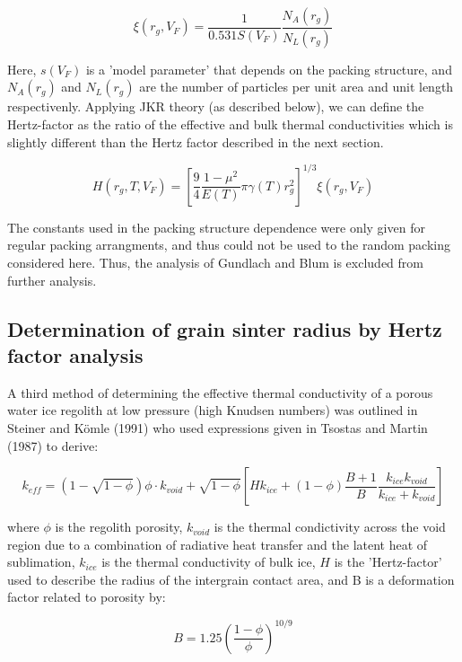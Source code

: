 \documentclass[11pt]{article} %
\newcommand{\vf}{\ensuremath{V_{F}}\xspace}
\begin{document}
\begin{itemize}
	\begin{equation}
	\xi(r_{g}, \vf) = \frac{1}{0.531 S(\vf)} \frac{N_{A}(r_{g})}{N_{L}(r_{g})}
	\end{equation}

	Here, $s(\vf)$ is a 'model parameter' that depends on the packing structure, and $N_{A}(r_{g})$ and $N_{L}(r_{g})$ are the number of particles per unit area and unit length respectivenly. Applying JKR theory (as described below), we can define the Hertz-factor as the ratio of the effective and bulk thermal conductivities which is slightly different than the Hertz factor described in the next section. 
	 
	\begin{equation} \label{eq:GBHertz}
	H(r_{g}, T, \vf) = [\frac{9}{4} \frac{1-\mu^{2}}{E(T)} \pi \gamma(T) r_{g}^{2} ]^{1/3} \xi(r_{g}, \vf)
	\end{equation}
	
	The constants used in the packing structure dependence were only given for regular packing arrangments, and thus could not be used to the random packing considered here. Thus, the analysis of Gundlach and Blum is excluded from further analysis. 
	
\subsection{Determination of grain sinter radius by Hertz factor analysis}

	A third method of determining the effective thermal conductivity of a porous water ice regolith at low pressure (high Knudsen numbers) was outlined in Steiner and K\"{o}mle (1991) who used expressions given in Tsostas and Martin (1987) to derive:

	\begin{equation}
	k_{eff} = (1-\sqrt{1-\phi})\phi \cdot k_{void} + \sqrt{1-\phi}[H k_{ice}+(1-\phi)\frac{B+1}{B}\frac{k_{ice}k_{void}}{k_{ice}+k_{void}}]
	\end{equation}
	
	where $\phi$ is the regolith porosity, $k_{void}$ is the thermal condictivity across the void region due to a combination of radiative heat transfer and the latent heat of sublimation, $k_{ice}$ is the thermal conductivity of bulk ice, $H$ is the 'Hertz-factor' used to describe the radius of the intergrain contact area, and B is a deformation factor related to porosity by:
	
	\begin{equation}
	B = 1.25 ( \frac{1-\phi}{\phi} )^{10/9}
	\end{equation}
	

\end{itemize}
\end{document}
